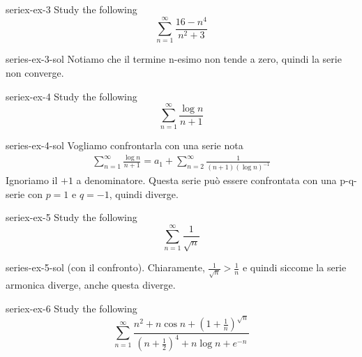 \documentclass[preview]{standalone}
\begin{document}
\begin{snippetexercise}{seriex-ex-3}{}
    Study the following \series
    \[
        \sum_{n=1}^\infty \frac{16-n^4}{n^2 + 3}
    \]
\end{snippetexercise}

\begin{snippetsolution}{series-ex-3-sol}{}
    Notiamo che il termine n-esimo non tende a zero, quindi la serie non converge.
\end{snippetsolution}

\begin{snippetexercise}{seriex-ex-4}{}
    Study the following \series
    \[
        \sum_{n=1}^\infty \frac{\log n}{n+1}
    \]
\end{snippetexercise}

\begin{snippetsolution}{series-ex-4-sol}{}
    Vogliamo confrontarla con una serie nota
    \begin{align*}
        \sum_{n=1}^\infty \frac{\log n}{n+1}
        = a_1 + \sum_{n=2}^\infty \frac{1}{(n+1){(\log n)}^{-1}}
    \end{align*}
    Ignoriamo il \(+1\) a denominatore. Questa serie può essere confrontata con una p-q-serie
    con \(p=1\) e \(q=-1\), quindi diverge.
\end{snippetsolution}

\begin{snippetexercise}{seriex-ex-5}{}
    Study the following \series
    \[
        \sum_{n=1}^\infty \frac{1}{\sqrt{n}}
    \]
\end{snippetexercise}

\begin{snippetsolution}{series-ex-5-sol}{}
    (con il confronto).
    Chiaramente, \(\frac{1}{\sqrt{n}} > \frac{1}{n}\)
    e quindi siccome la serie armonica diverge, anche questa diverge.
\end{snippetsolution}

\begin{snippetexercise}{seriex-ex-6}{}
    Study the following \series
    \[
        \sum_{n=1}^\infty \frac{
            n^2 + n\cos n + {\left(1 + \frac{1}{n}\right)}^{\sqrt{n}}
        }{
            {\left(n+\frac{1}{2}\right)}^4
            + n\log n + e^{-n}
        }
    \]
\end{snippetexercise}
\end{document}
